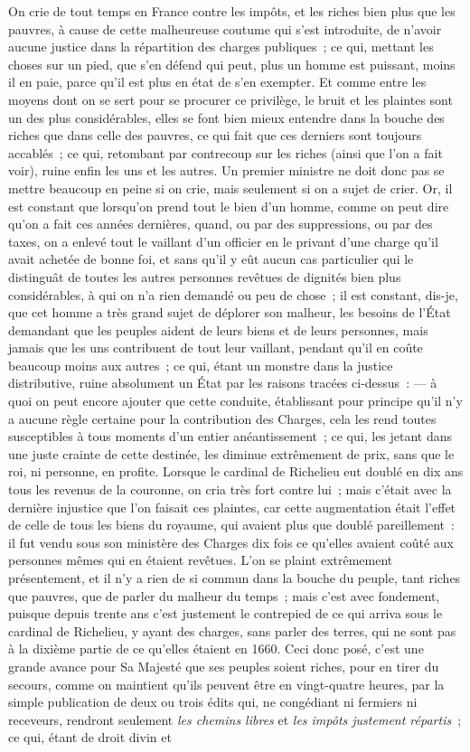\documentclass[french,twoside]{book} %
\begin{document}
On crie de tout temps en France contre les impôts, et les riches bien plus que les pauvres, à cause de cette malheureuse coutume qui s’est introduite, de n’avoir aucune justice dans la répartition des charges publiques ; ce qui, mettant les choses sur un pied, que s’en défend qui peut, plus un homme est puissant, moins il en paie, parce qu’il est plus en état de s’en exempter. Et comme entre les moyens dont on se sert pour se procurer ce privilège, le bruit et les plaintes sont un des plus considérables, elles se font bien mieux entendre dans la bouche des riches que dans celle des pauvres, ce qui fait que ces derniers sont toujours accablés ; ce qui, retombant par contrecoup sur les riches (ainsi que l’on a fait voir), ruine enfin les uns et les autres. Un premier ministre ne doit donc pas se mettre beaucoup en peine si on crie, mais seulement si on a sujet de crier. Or, il est constant que lorsqu’on prend tout le bien d’un homme, comme on peut dire qu’on a fait ces années dernières, quand, ou par des suppressions, ou par des taxes, on a enlevé tout le vaillant d’un officier en le privant d’une charge qu’il avait achetée de bonne foi, et sans qu’il y eût aucun cas particulier qui le distinguât de toutes les autres personnes revêtues de dignités bien plus considérables, à qui on n’a rien demandé ou peu de chose ; il est constant, dis-je, que cet homme a très grand sujet de déplorer son malheur, les besoins de l’État demandant que les peuples aident de leurs biens et de leurs personnes, mais jamais que les uns contribuent de tout leur vaillant, pendant qu’il en coûte beaucoup moins aux autres ; ce qui, étant un monstre dans la justice distributive, ruine absolument un État par les raisons tracées ci-dessus : — à quoi on peut encore ajouter que cette conduite, établissant pour principe qu’il n’y a aucune règle certaine pour la contribution des Charges, cela les rend toutes susceptibles à tous moments d’un entier anéantissement ; ce qui, les jetant dans une juste crainte de cette destinée, les diminue extrêmement de prix, sans que le roi, ni personne, en profite. Lorsque le cardinal de Richelieu eut doublé en dix ans tous les revenus de la couronne, on cria très fort contre lui ; mais c’était avec la dernière injustice que l’on faisait ces plaintes, car cette augmentation était l’effet de celle de tous les biens du royaume, qui avaient plus que doublé pareillement : il fut vendu sous son ministère des Charges dix fois ce qu’elles avaient coûté aux personnes mêmes qui en étaient revêtues. L’on se plaint extrêmement présentement, et il n’y a rien de si commun dans la bouche du peuple, tant riches que pauvres, que de parler du malheur du temps ; mais c’est avec fondement, puisque depuis trente ans c’est justement le contrepied de ce qui arriva sous le cardinal de Richelieu, y ayant des charges, sans parler des terres, qui ne sont pas à la dixième partie de ce qu’elles étaient en 1660. Ceci donc posé, c’est une grande avance pour Sa Majesté que ses peuples soient riches, pour en tirer du secours, comme on maintient qu’ils peuvent être en vingt-quatre heures, par la simple publication de deux ou trois édits qui, ne congédiant ni fermiers ni receveurs, rendront seulement {\itshape les chemins libres} et {\itshape les impôts justement répartis} ; ce qui, étant de droit divin et 
\end{document}
